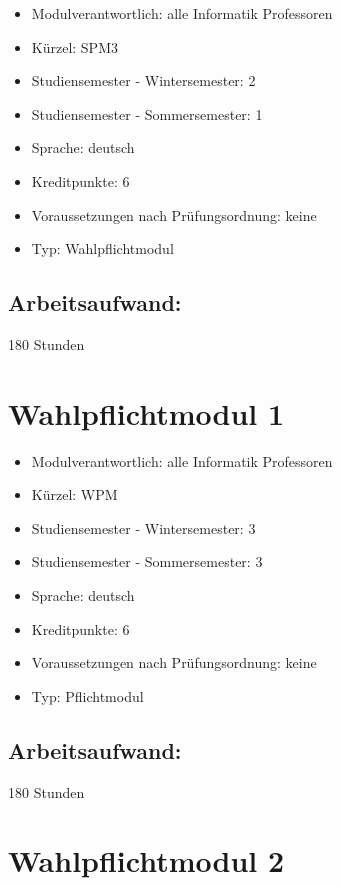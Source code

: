 \begin{itemize}
\tightlist
\item
  Modulverantwortlich: alle Informatik Professoren
\item
  Kürzel: SPM3
\item
  Studiensemester - Wintersemester: 2
\item
  Studiensemester - Sommersemester: 1
\item
  Sprache: deutsch
\item
  Kreditpunkte: 6
\item
  Voraussetzungen nach Prüfungsordnung: keine
\item
  Typ: Wahlpflichtmodul
\end{itemize}

\section*{Arbeitsaufwand:}\label{arbeitsaufwand-5}

180 Stunden

\chapter{Wahlpflichtmodul 1}\label{wahlpflichtmodul-1}

\begin{itemize}
\tightlist
\item
  Modulverantwortlich: alle Informatik Professoren
\item
  Kürzel: WPM
\item
  Studiensemester - Wintersemester: 3
\item
  Studiensemester - Sommersemester: 3
\item
  Sprache: deutsch
\item
  Kreditpunkte: 6
\item
  Voraussetzungen nach Prüfungsordnung: keine
\item
  Typ: Pflichtmodul
\end{itemize}

\section*{Arbeitsaufwand:}\label{arbeitsaufwand-6}

180 Stunden

\chapter{Wahlpflichtmodul 2}\label{wahlpflichtmodul-2}

